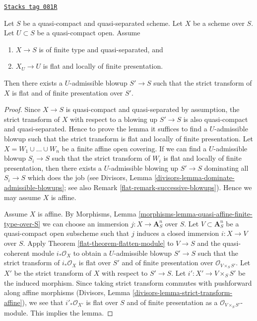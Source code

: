 \begin{lemma}
\label{flat-lemma-flat-after-blowing-up}
\href{https://stacks.math.columbia.edu/tag/081R}{\texttt{Stacks tag 081R}}

Let $S$ be a quasi-compact and quasi-separated scheme.
Let $X$ be a scheme over $S$.
Let $U \subset S$ be a quasi-compact open.
Assume
\begin{enumerate}
\item $X \to S$ is of finite type and quasi-separated, and
\item $X_U \to U$ is flat and locally of finite presentation.
\end{enumerate}
Then there exists a $U$-admissible blowup $S' \to S$ such that
the strict transform of $X$ is flat and of finite presentation
over $S'$.
\end{lemma}

\begin{proof}

Since $X \to S$ is quasi-compact and quasi-separated by assumption,
the strict transform of $X$ with respect to a blowing up $S' \to S$
is also quasi-compact and quasi-separated. Hence to prove the lemma
it suffices to find a $U$-admissible blowup such that the strict
transform is flat and locally of finite presentation.
Let $X = W_1 \cup \ldots \cup W_n$ be a finite affine open covering.
If we can find a $U$-admissible blowup $S_i \to S$ such that the
strict transform of $W_i$ is flat and locally of finite presentation,
then there exists a $U$-admissible blowing up $S' \to S$ dominating
all $S_i \to S$ which does the job (see
Divisors, Lemma \ref{divisors-lemma-dominate-admissible-blowups};
see also Remark \ref{flat-remark-successive-blowups}).
Hence we may assume $X$ is affine.

\medskip\noindent
Assume $X$ is affine. By
Morphisms, Lemma \ref{morphisms-lemma-quasi-affine-finite-type-over-S}
we can choose an immersion $j : X \to \mathbf{A}^n_S$ over $S$.
Let $V \subset \mathbf{A}^n_S$ be a quasi-compact open subscheme
such that $j$ induces a closed immersion $i : X \to V$ over $S$. Apply
Theorem \ref{flat-theorem-flatten-module}
to $V \to S$ and the quasi-coherent module $i_*\mathcal{O}_X$
to obtain a $U$-admissible blowup $S' \to S$ such that the strict
transform of $i_*\mathcal{O}_X$ is flat over $S'$ and of finite presentation
over $\mathcal{O}_{V \times_S S'}$. Let $X'$ be the strict transform
of $X$ with respect to $S' \to S$. Let $i' : X' \to V \times_S S'$
be the induced morphism.
Since taking strict transform commutes with pushforward along affine
morphisms (Divisors, Lemma \ref{divisors-lemma-strict-transform-affine}),
we see that $i'_*\mathcal{O}_{X'}$ is flat over $S$ and of
finite presentation as a $\mathcal{O}_{V \times_S S'}$-module.
This implies the lemma.
\end{proof}

